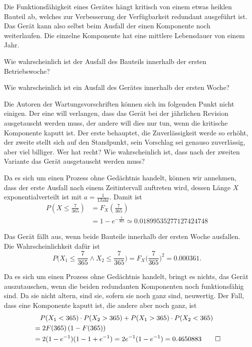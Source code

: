 Die Funktionsfähigkeit eines Gerätes hängt kritisch von einem etwas
heiklen Bauteil ab, welches zur Verbesserung der Verfügbarkeit redundant
ausgeführt ist. Das Gerät kann also selbst beim Ausfall der einen
Komponente noch weiterlaufen. Die einzelne Komponente hat eine mittlere
Lebensdauer von einem Jahr.
\begin{teilaufgaben}
\item Wie wahrscheinlich ist der Ausfall des Bauteils innerhalb der
ersten Betriebswoche?
\item Wie wahrscheinlich ist ein Ausfall des Gerätes innerhalb der
ersten Woche?
\item Die Autoren der Wartungsvorschriften können sich im folgenden Punkt
nicht einigen. Der eine will verlangen, dass das Gerät bei der jährlichen
Revision ausgetauscht werden muss, der andere will dies nur tun, wenn
die kritische Komponente kaputt ist.
Der erste behauptet, die Zuverlässigkeit werde so erhöht, der zweite
stellt sich auf den Standpunkt, sein Vorschlag sei genauso zuverlässig,
aber viel billiger. Wer hat recht? Wie wahrscheinlich ist, dass nach der
zweiten Variante das Gerät ausgetauscht werden muss?
\end{teilaufgaben}


\begin{loesung}
\begin{teilaufgaben}
\item Da es sich um einen Prozess ohne Gedächtnis handelt, können wir
annehmen, dass der erste Ausfall nach einem Zeitintervall auftreten
wird, dessen Länge $X$ exponentialverteilt ist mit $a=\frac1{1\text{Jahr}}$.
Damit ist
\begin{align*}
P\left(X\le \frac{7}{365}\right)
&=
F_X\left(\frac{7}{365}\right)\\
&=
1-e^{-\frac{7}{365}}
\simeq
0.01899535277127424748
\end{align*}
\item
Das Gerät fällt aus, wenn beide Bauteile innerhalb der ersten
Woche ausfallen. Die Wahrscheinlichkeit dafür ist
\[
P\biggl(X_1\le \frac{7}{365}\wedge X_2\le \frac{7}{365}\biggr)
=F_X\biggl(\frac{7}{365}\biggr)^2=0.000361.
\]
\item
Da es sich um einen Prozess ohne Gedächtnis handelt, bringt es
nichts, das Gerät auszutauschen, wenn die beiden redundanten Komponenten
noch funktionsfähig sind. Da sie nicht altern, sind sie, sofern sie
noch ganz sind, neuwertig.
Der Fall, dass eine Komponente kaputt ist, die andere aber noch ganz,
ist
\begin{align*}
&\quad P(X_1 < 365)\cdot P(X_2>365)
+P(X_1 > 365)\cdot P(X_2<365)
\\
&=
2F(365)\,(1-F(365))
\\
&=
2(1-e^{-1})(1-1+e^{-1})=2e^{-1}(1-e^{-1})=0.4650883
\qedhere
\end{align*}
\end{teilaufgaben}
\end{loesung}

